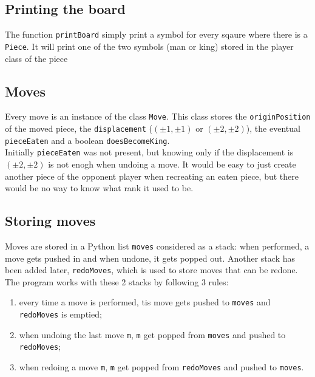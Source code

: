 \documentclass[10pt, a4paper]{article}
\begin{document}
	\subsection{Printing the board}
	The function \texttt{printBoard} simply print a symbol for every sqaure where there is a \texttt{Piece}. It will print one of the two symbols (man or king) stored in the player class of the piece

	\subsection{Moves}
	Every move is an instance of the class \texttt{Move}. This class stores the \texttt{originPosition} of the moved piece, the \texttt{displacement} (\((\pm1, \pm1)\) or \((\pm2, \pm2)\)), the eventual \texttt{pieceEaten} and a boolean \texttt{doesBecomeKing}. \\
	Initially \texttt{pieceEaten} was not present, but knowing only if the displacement is \((\pm2, \pm2)\) is not enogh when undoing a move. It would be easy to just create another piece of the opponent player when recreating an eaten piece, but there would be no way to know what rank it used to be.
	
	\subsection{Storing moves}
	Moves are stored in a Python list \texttt{moves} considered as a stack: when performed, a move gets pushed in and when undone, it gets popped out. Another stack has been added later, \texttt{redoMoves}, which is used to store moves that can be redone. \\
	The program works with these 2 stacks by following 3 rules:
	\begin{enumerate}
		\item every time a move is performed, tis move gets pushed to \texttt{moves} and \texttt{redoMoves} is emptied;
		\item when undoing the last move \texttt{m}, \texttt{m} get popped from \texttt{moves} and pushed to \texttt{redoMoves};
		\item when redoing a move \texttt{m}, \texttt{m} get popped from \texttt{redoMoves} and pushed to \texttt{moves}.
	\end{enumerate}
	
\end{document}

